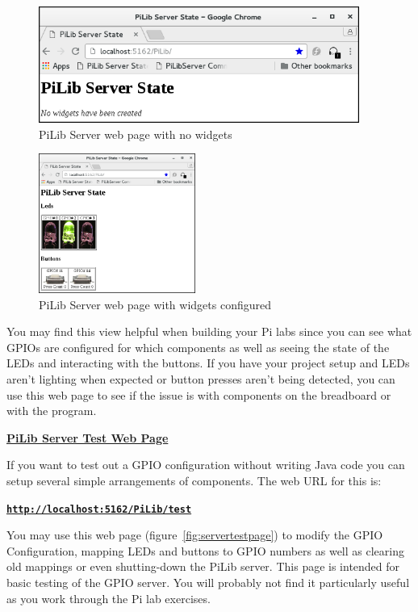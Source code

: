 \begin{figure}[H]
	\centering
	\includegraphics[height=1.50in]{pi_images/PiLibServerNoWidgets.png}
	\caption{PiLib Server web page with no widgets}
	\label{fig:servernowidget}
\end{figure}

\begin{figure}[H]
	\centering
	\includegraphics[height=1.8in]{pi_images/PiLibServerWithWidgets.png}
	\caption{PiLib Server web page with widgets configured}
	\label{fig:serverwithwidget}
\end{figure}

You may find this view helpful when building your Pi labs since you can see what GPIOs are configured for which components as well as seeing the state of the LEDs and interacting with the buttons. If you have your project setup and LEDs aren't lighting when expected or button presses aren't being detected, you can use this web page to see if the issue is with components on the breadboard or with the program.

\textbf{\underline{PiLib Server Test Web Page}}

If you want to test out a GPIO configuration without writing Java code you can setup several simple arrangements of components. The web URL for this is:

\textbf{\texttt{\url{http://localhost:5162/PiLib/test}}}

You may use this web page (figure~\ref{fig:servertestpage}) to modify the GPIO Configuration, mapping LEDs and buttons to GPIO numbers as well as clearing old mappings or even shutting-down the PiLib server. This page is intended for basic testing of the GPIO server. You will probably not find it particularly useful as you work through the Pi lab exercises.

